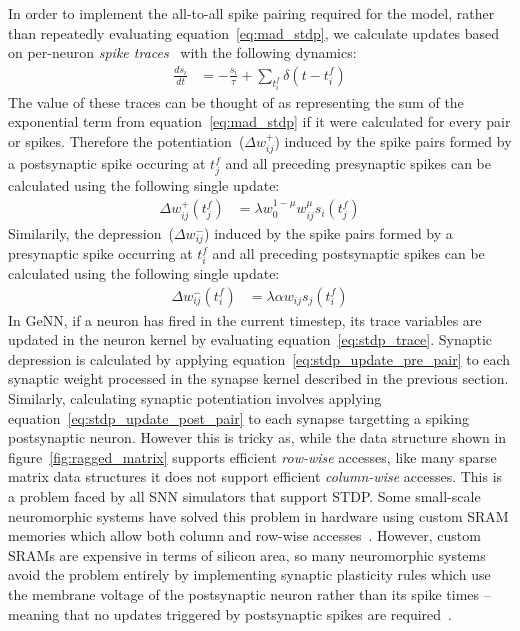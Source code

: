 \documentclass[utf8]{frontiersSCNS} %
\begin{document}
In order to implement the all-to-all spike pairing required for the model, rather than repeatedly evaluating equation~\ref{eq:mad_stdp}, we calculate updates based on per-neuron \textit{spike traces}~\citep{Song2000, Morrison2007} with the following dynamics:
%
\begin{align}
    \frac{ds_{i}}{dt} & = -\frac{s_{i}}{\tau} + \sum_{t_{i}^{f}}\delta(t - t_{i}^{f}) \label{eq:stdp_trace}
\end{align}
%
The value of these traces can be thought of as representing the sum of the exponential term from equation~\ref{eq:mad_stdp} if it were calculated for every pair or spikes.
Therefore the potentiation~($\Delta w_{ij}^{+}$) induced by the spike pairs formed by a postsynaptic spike occuring at $t_{j}^{f}$ and all preceding presynaptic spikes can be calculated using the following single update:
%
\begin{align}
  \Delta w_{ij}^{+}(t_{j}^{f}) & = \lambda w_{0}^{1-\mu} w_{ij}^{\mu} s_{i}(t_{j}^{f})\label{eq:stdp_update_post_pair}
\end{align}
%
Similarily, the depression~($\Delta w_{ij}^{-}$) induced by the spike pairs formed by a presynaptic spike occurring at $t_{i}^{f}$ and all preceding postsynaptic spikes can be calculated using the following single update:
\begin{align}
    \Delta w_{ij}^{-}(t_{i}^{f}) & = \lambda \alpha w_{ij} s_{j}(t_{i}^{f})\label{eq:stdp_update_pre_pair}
\end{align}
%
In GeNN, if a neuron has fired in the current timestep, its trace variables are updated in the neuron kernel by evaluating equation~\ref{eq:stdp_trace}.
Synaptic depression is calculated by applying equation~\ref{eq:stdp_update_pre_pair} to each synaptic weight processed in the synapse kernel described in the previous section.
Similarly, calculating synaptic potentiation involves applying equation~\ref{eq:stdp_update_post_pair} to each synapse targetting a spiking postsynaptic neuron.
However this is tricky as, while the data structure shown in figure~\ref{fig:ragged_matrix} supports efficient \textit{row-wise} accesses, like many sparse matrix data structures it does not support efficient \textit{column-wise} accesses.
This is a problem faced by all SNN simulators that support STDP.
Some small-scale neuromorphic systems have solved this problem in hardware using custom SRAM memories which allow both column and row-wise accesses~\citep{Seo2011}.
However, custom SRAMs are expensive in terms of silicon area, so many neuromorphic systems avoid the problem entirely by implementing synaptic plasticity rules which use the membrane voltage of the postsynaptic neuron rather than its spike times -- meaning that no updates triggered by postsynaptic spikes are required~\citep{Frenkel2018,Qiao2015}.
\end{document}
